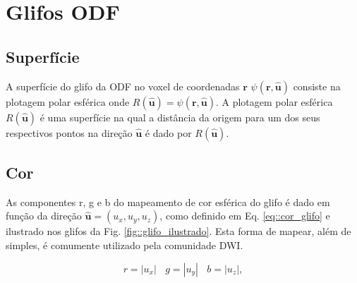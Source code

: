 \documentclass[
    12pt,                %
    oneside,            %
    a4paper,            %
    english,            %
    french,                %
    spanish,            %
    brazil                %
    ]{abntex2}
\begin{document}

\section{Glifos ODF}
\label{sec::glifos_odf}

\subsection{Superfície}

A superfície do glifo da ODF no voxel de coordenadas $\mathbf{r}$ $\psi(\mathbf{r}, \mathbf{\hat{u}})$ consiste na plotagem polar esférica onde $R(\mathbf{\hat{u}}) = \psi(\mathbf{r}, \mathbf{\hat{u}})$. A plotagem polar esférica $R(\mathbf{\hat{u}})$ é uma superfície na qual a distância da origem para um dos seus respectivos pontos na direção $\mathbf{\hat{u}}$ é dado por $R(\mathbf{\hat{u}})$.


\subsection{Cor}

As componentes r, g e b do mapeamento de cor esférica do glifo é dado em função da direção $\mathbf{\hat{u}} = (u_x, u_y, u_z)$, como definido em Eq. \ref{eq::cor_glifo} e ilustrado nos glifos da Fig. \ref{fig::glifo_ilustrado}. Esta forma de mapear, além de simples, é comumente utilizado pela comunidade DWI. %

\begin{equation}
\label{eq::cor_glifo}
    r = |u_x| ~~~~ g = |u_y| ~~~~ b = |u_z|, 
\end{equation}
\end{document}
